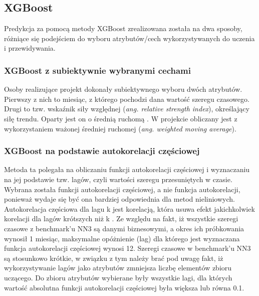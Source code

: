 \documentclass[11pt]{report}
\begin{document}
\subsection{XGBoost}

Predykcja za pomocą metody XGBoost zrealizowana została na dwa sposoby, różniące się podejściem do wyboru atrybutów/cech wykorzystywanych do uczenia i przewidywania.

\subsubsection{XGBoost z subiektywnie wybranymi cechami}
Osoby realizujące projekt dokonały subiektywnego wyboru dwóch atrybutów.
Pierwszy z nich to miesiąc, z którego pochodzi dana wartość szeregu czasowego.
Drugi to tzw. wskaźnik siły względnej (\textit{ang. relative strength index}), określający siłę trendu.
Oparty jest on o średnią ruchomą \cite{noauthor_relative_2018}.
W projekcie obliczany jest z wykorzystaniem ważonej średniej ruchomej (\textit{ang. weighted moving average}).

\subsubsection{XGBoost na podstawie autokorelacji częściowej}
Metoda ta polegała na obliczaniu funkcji autokorelacji częściowej i wyznaczaniu na jej podstawie tzw. lagów, czyli wartości szeregu przesuniętych w czasie.
Wybrana została funkcji autokorelacji częściowej, a nie funkcja autokorelacji, ponieważ wydaje się być ona bardziej odpowiednia dla metod nieliniowych.
Autokorelacja częściowa dla lagu k jest korelacją, która usuwa efekt jakichkolwiek korelacji dla lagów krótszych niż k \cite{cowpertwait_introductory_2009}.
Ze względu na fakt, iż wszystkie szeregi czasowe z benchmark'u NN3 są danymi biznesowymi, a okres ich próbkowania wynosił 1 miesiąc, maksymalne opóżnienie (lag) dla którego jest wyznaczana funkcja autokorelacji częściowej wynosi 12.
Szeregi czasowe w benchmark'u NN3 są stosunkowo krótkie, w związku z tym należy brać pod uwagę fakt, iż wykorzystywanie lagów jako atrybutów zmniejsza liczbę elementów zbioru uczącego.
Do zbioru atrybutów wybierane były wszystkie lagi, dla których wartość absolutna funkcji autokorelacji częściowej była większa lub równa 0.1.
\end{document}
